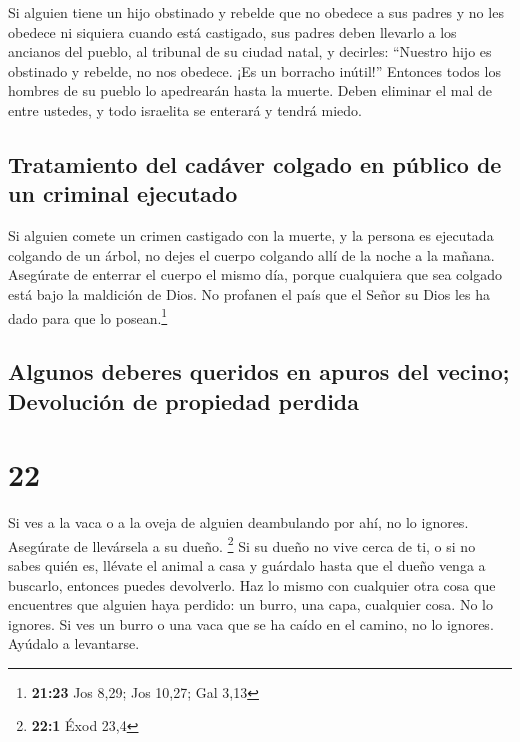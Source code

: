  Si alguien tiene un hijo obstinado y rebelde que no
obedece a sus padres y no les obedece ni siquiera cuando está castigado,
 sus padres deben llevarlo a los ancianos del pueblo, al
tribunal de su ciudad natal,  y decirles: ``Nuestro hijo
es obstinado y rebelde, no nos obedece. ¡Es un borracho inútil!''
 Entonces todos los hombres de su pueblo lo apedrearán
hasta la muerte. Deben eliminar el mal de entre ustedes, y todo
israelita se enterará y tendrá miedo.

\hypertarget{tratamiento-del-caduxe1ver-colgado-en-puxfablico-de-un-criminal-ejecutado}{%
\subsection{Tratamiento del cadáver colgado en público de un criminal
ejecutado}\label{tratamiento-del-caduxe1ver-colgado-en-puxfablico-de-un-criminal-ejecutado}}

 Si alguien comete un crimen castigado con la muerte, y
la persona es ejecutada colgando de un árbol,  no dejes
el cuerpo colgando allí de la noche a la mañana. Asegúrate de enterrar
el cuerpo el mismo día, porque cualquiera que sea colgado está bajo la
maldición de Dios. No profanen el país que el Señor su Dios les ha dado
para que lo posean.\footnote{\textbf{21:23} Jos 8,29; Jos 10,27; Gal
  3,13}

\hypertarget{algunos-deberes-queridos-en-apuros-del-vecino-devoluciuxf3n-de-propiedad-perdida}{%
\subsection{Algunos deberes queridos en apuros del vecino; Devolución de
propiedad
perdida}\label{algunos-deberes-queridos-en-apuros-del-vecino-devoluciuxf3n-de-propiedad-perdida}}

\hypertarget{section-21}{%
\section{22}\label{section-21}}

 Si ves a la vaca o a la oveja de alguien deambulando por
ahí, no lo ignores. Asegúrate de llevársela a su dueño. \footnote{\textbf{22:1}
  Éxod 23,4}  Si su dueño no vive cerca de ti, o si no
sabes quién es, llévate el animal a casa y guárdalo hasta que el dueño
venga a buscarlo, entonces puedes devolverlo.  Haz lo
mismo con cualquier otra cosa que encuentres que alguien haya perdido:
un burro, una capa, cualquier cosa. No lo ignores.  Si ves
un burro o una vaca que se ha caído en el camino, no lo ignores. Ayúdalo
a levantarse.

